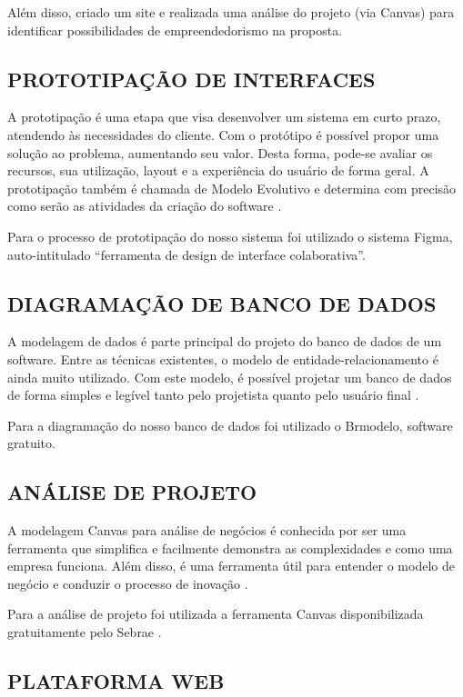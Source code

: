 Além disso, criado um site e realizada uma análise do projeto (via Canvas) para identificar possibilidades de empreendedorismo na proposta.

\subsection*{PROTOTIPAÇÃO DE INTERFACES} 

A prototipação é uma etapa que visa desenvolver um sistema em curto prazo, atendendo às necessidades do cliente. Com o protótipo é possível propor uma solução ao problema, aumentando seu valor. Desta forma, pode-se avaliar os recursos, sua utilização, layout e a experiência do usuário de forma geral. A prototipação também é chamada de Modelo Evolutivo e determina com precisão como serão as atividades da criação do software \cite{rocha2019}.

Para o processo de prototipação do nosso sistema foi utilizado o sistema Figma, auto-intitulado “ferramenta de design de interface colaborativa”.

\subsection*{DIAGRAMAÇÃO DE BANCO DE DADOS}

A modelagem de dados é parte principal do projeto do banco de dados de um software. Entre as técnicas existentes, o modelo de entidade-relacionamento é ainda muito utilizado. Com este modelo, é possível projetar um banco de dados de forma simples e legível tanto pelo projetista quanto pelo usuário final \cite{terra2020}.

Para a diagramação do nosso banco de dados foi utilizado o Brmodelo, software gratuito.

\subsection*{ANÁLISE DE PROJETO}

A modelagem Canvas para análise de negócios é conhecida por ser uma ferramenta que simplifica e facilmente demonstra as complexidades e como uma empresa funciona. Além disso, é uma ferramenta útil para entender o modelo de negócio e conduzir o processo de inovação \cite{quastharin2016}.

Para a análise de projeto foi utilizada a ferramenta Canvas disponibilizada gratuitamente pelo Sebrae \citeyear{sebrae2024}.

\subsection*{PLATAFORMA WEB}

